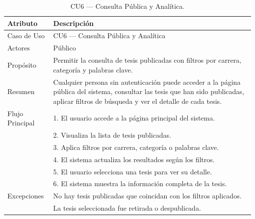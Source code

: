 \begin{table}[H]
\centering
\caption{CU6 — Consulta Pública y Analítica.}
\label{tab:cu6}
\begin{tabular}{lp{10cm}}
\toprule
\textbf{Atributo} & \textbf{Descripción} \\
\midrule
Caso de Uso & CU6 — Consulta Pública y Analítica \\
Actores & Público \\
Propósito & Permitir la consulta de tesis publicadas con filtros por carrera, categoría y palabras clave. \\
Resumen & Cualquier persona sin autenticación puede acceder a la página pública del sistema, consultar las tesis que han sido publicadas, aplicar filtros de búsqueda y ver el detalle de cada tesis. \\
Flujo Principal & 1. El usuario accede a la página principal del sistema. \\
& 2. Visualiza la lista de tesis publicadas. \\
& 3. Aplica filtros por carrera, categoría o palabras clave. \\
& 4. El sistema actualiza los resultados según los filtros. \\
& 5. El usuario selecciona una tesis para ver su detalle. \\
& 6. El sistema muestra la información completa de la tesis. \\
Excepciones & No hay tesis publicadas que coincidan con los filtros aplicados. \\
& La tesis seleccionada fue retirada o despublicada. \\
\bottomrule
\end{tabular}
\end{table}

